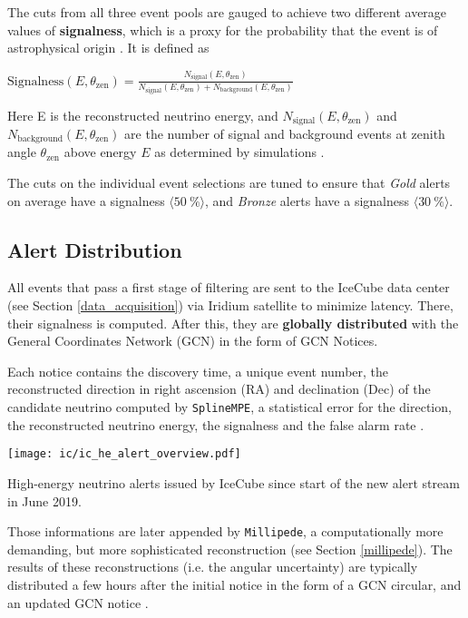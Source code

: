 The cuts from all three event pools are gauged to achieve two different average values of \textbf{signalness}, which is a proxy for the probability that the event is of astrophysical origin \cite{Abbasi2023}. It is defined as
\begin{definition}\label{signalness_def}
$\text{Signalness}(E,\theta_\text{zen}) = \frac{N_\text{signal}(E,\theta_\text{zen})}{N_\text{signal}(E,\theta_\text{zen})+N_\text{background}(E,\theta_\text{zen})}$
\end{definition}
Here E is the reconstructed neutrino energy, and $N_\text{signal}(E,\theta_\text{zen})$ and $N_\text{background}(E,\theta_\text{zen})$ are the number of signal and background events at zenith angle $\theta_\text{zen}$ above energy $E$ as determined by simulations \cite{Abbasi2023}.

The cuts on the individual event selections are tuned to ensure that \textit{Gold} alerts on average have a signalness $\langle \SI{50}{\percent} \rangle$, and \textit{Bronze} alerts have a signalness $\langle \SI{30}{\percent} \rangle$.

\subsection{Alert Distribution} \label{ic_alerts}
All events that pass a first stage of filtering are sent to the IceCube data center (see Section \ref{data_acquisition}) via Iridium satellite to minimize latency. There, their signalness is computed. After this, they are \textbf{globally distributed} with the General Coordinates Network (GCN) in the form of GCN Notices.

Each notice contains the discovery time, a unique event number, the reconstructed direction in right ascension (RA) and declination (Dec) of the candidate neutrino computed by \texttt{SplineMPE}, a statistical error for the direction, the reconstructed neutrino energy, the signalness and the false alarm rate \cite{Blaufuss2019}.

\begin{marginfigure}
    \texttt{[image: ic/ic\_he\_alert\_overview.pdf]}
    \caption[IceCube alert overview]{High-energy neutrino alerts issued by IceCube since start of the new alert stream in June 2019.}
\end{marginfigure}

Those informations are later appended by \texttt{Millipede}, a computationally more demanding, but more sophisticated reconstruction (see Section \ref{millipede}). The results of these reconstructions (i.e. the angular uncertainty) are typically distributed a few hours after the initial notice in the form of a GCN circular, and an updated GCN notice \cite{Blaufuss2019}.

